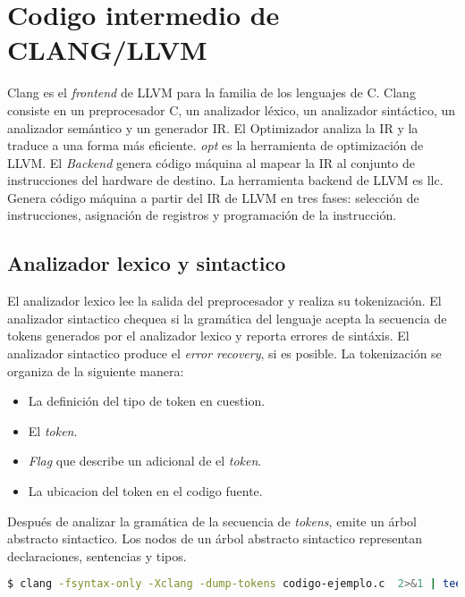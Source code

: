 \chapter{Codigo intermedio de CLANG/LLVM}

Clang es el \emph{frontend} de LLVM para la familia de los lenguajes de C. Clang consiste 
en un preprocesador C, un analizador léxico, un analizador sintáctico, un analizador 
semántico y un generador IR.
El Optimizador analiza la IR y la traduce a una forma más eficiente. \emph{opt} es la 
herramienta de optimización de LLVM.
El \emph{Backend} genera código máquina al mapear la IR al conjunto de instrucciones del 
hardware de destino. La herramienta backend de LLVM es llc. 
Genera código máquina a partir del IR de LLVM en tres fases: selección de instrucciones, 
asignación de registros y programación de la instrucción.

\section{Analizador lexico y sintactico}

El analizador lexico lee la salida del preprocesador y realiza su tokenización.
El analizador sintactico chequea si la gramática del lenguaje acepta la 
secuencia de tokens generados por el analizador lexico y reporta errores de sintáxis.
El analizador sintactico produce el \emph{error recovery}, si es posible.
La tokenización se organiza de la siguiente manera:
\begin{itemize}
    \item La definición del tipo de token en cuestion.
    \item El \emph{token}.
    \item \emph{Flag} que describe un adicional de el \emph{token}.
    \item La ubicacion del token en el codigo fuente.
\end{itemize}
Después de analizar la gramática de la secuencia de \emph{tokens}, 
emite un árbol abstracto sintactico. Los nodos de un árbol abstracto sintactico 
representan declaraciones, sentencias y tipos.

\begin{lstlisting}[label=comandoC, caption= Comando de compilación del archivo codigo-ejemplo.c \cite{repositorio} para CLANG/LLVM., language=bash]
    $ clang -fsyntax-only -Xclang -dump-tokens codigo-ejemplo.c  2>&1 | tee tokens  \end{lstlisting}

